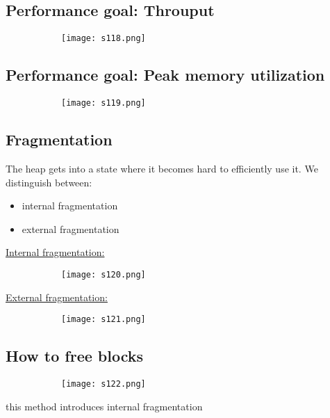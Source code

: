 \documentclass[8pt]{extreport}
\begin{document}
\subsection{Performance goal: Throuput}
\begin{figure}[H]
\centering
\begin{subfigure}[b]{0.4\linewidth}
\texttt{[image: s118.png]}
\end{subfigure}
\end{figure}

\subsection{Performance goal: Peak memory utilization}
\begin{figure}[H]
\centering
\begin{subfigure}[b]{0.4\linewidth}
\texttt{[image: s119.png]}
\end{subfigure}
\end{figure}

\subsection{Fragmentation}

The heap gets into a state where it becomes hard to efficiently use it. We distinguish between:
\begin{itemize}
\item internal fragmentation
\item external fragmentation
\end{itemize}
\underline{Internal fragmentation:}
\begin{figure}[H]
\centering
\begin{subfigure}[b]{0.4\linewidth}
\texttt{[image: s120.png]}
\end{subfigure}
\end{figure}
\underline{External fragmentation:}
\begin{figure}[H]
\centering
\begin{subfigure}[b]{0.4\linewidth}
\texttt{[image: s121.png]}
\end{subfigure}
\end{figure}

\subsection{How to free blocks}
\begin{figure}[H]
\centering
\begin{subfigure}[b]{0.4\linewidth}
\texttt{[image: s122.png]}
\end{subfigure}
\end{figure}
this method introduces internal fragmentation
\end{document}
